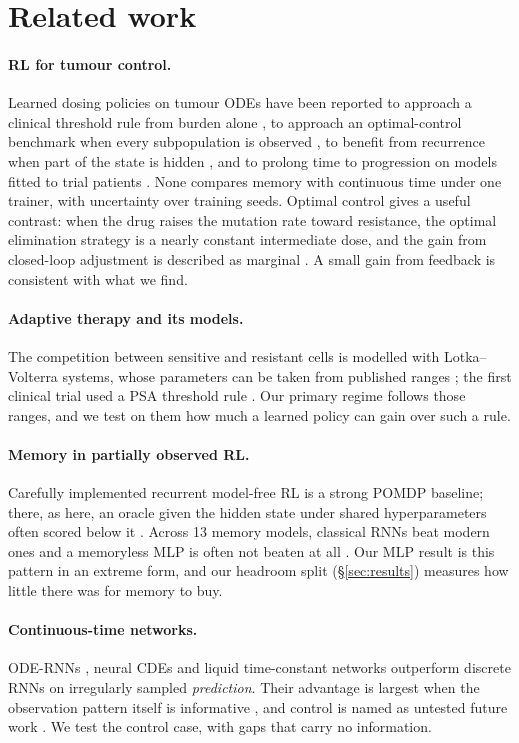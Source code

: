 \documentclass[10pt]{article}
\renewcommand{\cite}{\citep}
\begin{document}
\section{Related work}
\paragraph{RL for tumour control.} Learned dosing policies on tumour ODEs have
been reported to approach a clinical threshold rule from burden alone
\cite{gallagher2024}, to approach an optimal-control benchmark when every
subpopulation is observed \cite{kidane2026}, to benefit from recurrence when part
of the state is hidden \cite{kiram2026}, and to prolong time to progression on
models fitted to trial patients \cite{lu2024}. None compares memory with
continuous time under one trainer, with uncertainty over training seeds. Optimal
control gives a useful contrast: when the drug raises the mutation rate toward
resistance, the optimal elimination strategy is a nearly constant intermediate
dose, and the gain from closed-loop adjustment is described as marginal
\cite{kuosmanen2021}. A small gain from feedback is consistent with what we find.
\paragraph{Adaptive therapy and its models.} The competition between sensitive
and resistant cells is modelled with Lotka--Volterra systems, whose parameters
can be taken from published ranges \cite{strobl2021}; the first clinical trial
used a PSA threshold rule \cite{zhang2017}. Our primary regime follows those
ranges, and we test on them how much a learned policy can gain over such a rule.
\paragraph{Memory in partially observed RL.} Carefully implemented recurrent
model-free RL is a strong POMDP baseline; there, as here, an oracle given the
hidden state under shared hyperparameters often scored below it \cite{ni2022}.
Across 13 memory models, classical RNNs beat modern ones and a memoryless MLP is
often not beaten at all \cite{morad2023}. Our MLP result is this pattern in an
extreme form, and our headroom split (\S\ref{sec:results}) measures how little
there was for memory to buy.
\paragraph{Continuous-time networks.} ODE-RNNs \cite{rubanova2019}, neural CDEs
\cite{kidger2020} and liquid time-constant networks \cite{hasani2021} outperform
discrete RNNs on irregularly sampled \emph{prediction}. Their advantage is
largest when the observation pattern itself is informative
\cite{rubanova2019,kidger2020}, and control is named as untested future work
\cite{hasani2021}. We test the control case, with gaps that carry no information.
\end{document}
